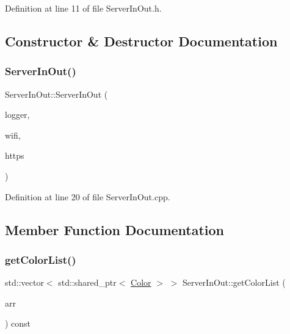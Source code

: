 Definition at line 11 of file Server\+In\+Out.\+h.



\subsection{Constructor \& Destructor Documentation}
\mbox{\label{class_server_in_out_a15b30010007404ca8665bd07cd71cc86}} 
\subsubsection{\texorpdfstring{Server\+In\+Out()}{ServerInOut()}}
{\footnotesize\ttfamily Server\+In\+Out\+::\+Server\+In\+Out (\begin{DoxyParamCaption}\item[{std\+::shared\+\_\+ptr$<$ \hyperlink{class_i_logger}{I\+Logger} $>$}]{logger,  }\item[{std\+::shared\+\_\+ptr$<$ \hyperlink{class_i_wi_fi}{I\+Wi\+Fi} $>$}]{wifi,  }\item[{std\+::shared\+\_\+ptr$<$ \hyperlink{class_i_http_client}{I\+Http\+Client} $>$}]{https }\end{DoxyParamCaption})}



Definition at line 20 of file Server\+In\+Out.\+cpp.



\subsection{Member Function Documentation}
\mbox{\label{class_server_in_out_a952f5812bddca76e92d5432c1890551d}} 
\subsubsection{\texorpdfstring{get\+Color\+List()}{getColorList()}}
{\footnotesize\ttfamily std\+::vector$<$ std\+::shared\+\_\+ptr$<$ \hyperlink{struct_color}{Color} $>$ $>$ Server\+In\+Out\+::get\+Color\+List (\begin{DoxyParamCaption}\item[{Json\+Array \&}]{arr }\end{DoxyParamCaption}) const\hspace{0.3cm}{\ttfamily [private]}}



